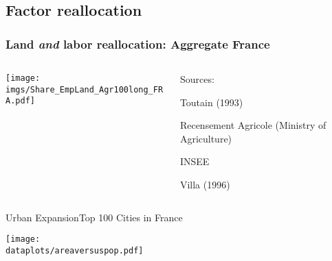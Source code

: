 \documentclass[aspectratio=169]{beamer}
\begin{document}
\subsection{Factor reallocation}

\begin{frame}
\frametitle{Land \emph{and} labor reallocation: Aggregate France}
\begin{columns}
\begin{column}{0.7\textwidth}
\texttt{[image: \\imgs/Share\_EmpLand\_Agr100long\_FRA.pdf]}
\end{column}
\begin{column}{0.3\textwidth}
Sources:
\begin{mide}
\item Toutain (1993) 
\item Recensement Agricole (Ministry of Agriculture)
\item INSEE
\item Villa (1996)
\end{mide}
\end{column}
\end{columns}
\end{frame}

\begin{frame}{Urban Expansion}{Top 100 Cities in France}
	\begin{adjustbox}{center}
	\texttt{[image: \\dataplots/areaversuspop.pdf]}\end{adjustbox}
	\end{frame}
	



\end{document}
